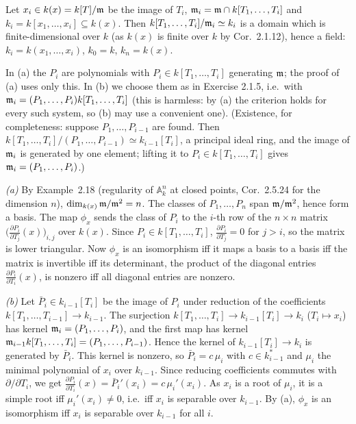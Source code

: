 \documentclass[11pt]{article}
\begin{document}
\pf
Let $x_i\in k(x)=k[T]/\mathfrak m$ be the image of $T_i$, $\mathfrak m_i=\mathfrak m\cap k[T_1,\dots,T_i]$ and $k_i=k[x_1,\dots,x_i]\subseteq k(x)$. Then $k[T_1,\dots,T_i]/\mathfrak m_i\simeq k_i$ is a domain which is finite-dimensional over $k$ (as $k(x)$ is finite over $k$ by Cor.~2.1.12), hence a field: $k_i=k(x_1,\dots,x_i)$, $k_0=k$, $k_n=k(x)$.

In (a) the $P_i$ are polynomials with $P_i\in k[T_1,\dots,T_i]$ generating $\mathfrak m$; the proof of (a) uses only this. In (b) we choose them as in Exercise 2.1.5, i.e.\ with $\mathfrak m_i=(P_1,\dots,P_i)k[T_1,\dots,T_i]$ (this is harmless: by (a) the criterion holds for every such system, so (b) may use a convenient one). (Existence, for completeness: suppose $P_1,\dots,P_{i-1}$ are found. Then $k[T_1,\dots,T_i]/(P_1,\dots,P_{i-1})\simeq k_{i-1}[T_i]$, a principal ideal ring, and the image of $\mathfrak m_i$ is generated by one element; lifting it to $P_i\in k[T_1,\dots,T_i]$ gives $\mathfrak m_i=(P_1,\dots,P_i)$.)

\emph{(a)} By Example~2.18 (regularity of $\mathbb A^n_k$ at closed points, Cor.~2.5.24 for the dimension $n$), $\dim_{k(x)}\mathfrak m/\mathfrak m^2=n$. The classes of $P_1,\dots,P_n$ span $\mathfrak m/\mathfrak m^2$, hence form a basis. The map $\phi_x$ sends the class of $P_i$ to the $i$-th row of the $n\times n$ matrix $\bigl(\frac{\partial P_i}{\partial T_j}(x)\bigr)_{i,j}$ over $k(x)$. Since $P_i\in k[T_1,\dots,T_i]$, $\frac{\partial P_i}{\partial T_j}=0$ for $j>i$, so the matrix is lower triangular. Now $\phi_x$ is an isomorphism iff it maps a basis to a basis iff the matrix is invertible iff its determinant, the product of the diagonal entries $\frac{\partial P_i}{\partial T_i}(x)$, is nonzero iff all diagonal entries are nonzero.

\emph{(b)} Let $\bar P_i\in k_{i-1}[T_i]$ be the image of $P_i$ under reduction of the coefficients $k[T_1,\dots,T_{i-1}]\to k_{i-1}$. The surjection $k[T_1,\dots,T_i]\to k_{i-1}[T_i]\to k_i$ ($T_i\mapsto x_i$) has kernel $\mathfrak m_i=(P_1,\dots,P_i)$, and the first map has kernel $\mathfrak m_{i-1}k[T_1,\dots,T_i]=(P_1,\dots,P_{i-1})$. Hence the kernel of $k_{i-1}[T_i]\to k_i$ is generated by $\bar P_i$. This kernel is nonzero, so $\bar P_i=c\,\mu_i$ with $c\in k_{i-1}^*$ and $\mu_i$ the minimal polynomial of $x_i$ over $k_{i-1}$. Since reducing coefficients commutes with $\partial/\partial T_i$, we get $\frac{\partial P_i}{\partial T_i}(x)=\bar P_i'(x_i)=c\,\mu_i'(x_i)$. As $x_i$ is a root of $\mu_i$, it is a simple root iff $\mu_i'(x_i)\ne0$, i.e.\ iff $x_i$ is separable over $k_{i-1}$. By (a), $\phi_x$ is an isomorphism iff $x_i$ is separable over $k_{i-1}$ for all $i$.
\end{document}
